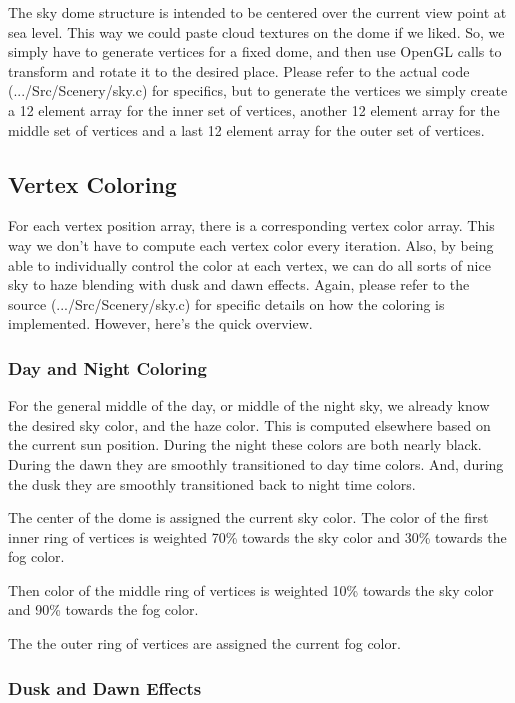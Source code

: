 \documentclass[12pt]{article}
\begin{document}
The sky dome structure is intended to be centered over the current
view point at sea level.  This way we could paste cloud textures on
the dome if we liked.  So, we simply have to generate vertices for a
fixed dome, and then use OpenGL calls to transform and rotate it to
the desired place.  Please refer to the actual code
(.../Src/Scenery/sky.c) for specifics, but
to generate the vertices we simply create a 12 element array for the
inner set of vertices, another 12 element array for the middle set of
vertices and a last 12 element array for the outer set of vertices.

\subsection{Vertex Coloring}

For each vertex position array, there is a corresponding vertex color
array.  This way we don't have to compute each vertex color every
iteration.  Also, by being able to individually control the color at
each vertex, we can do all sorts of nice sky to haze blending with
dusk and dawn effects.  Again, please refer to the source
(.../Src/Scenery/sky.c) for specific details on how the coloring is
implemented.  However, here's the quick overview.

\subsubsection{Day and Night Coloring}

For the general middle of the day, or middle of the night sky, we
already know the desired sky color, and the haze color.  This is
computed elsewhere based on the current sun position.  During the
night these colors are both nearly black.  During the dawn they are
smoothly transitioned to day time colors.  And, during the dusk they
are smoothly transitioned back to night time colors.

The center of the dome is assigned the current sky color.  The color
of the first inner ring of vertices is weighted 70\% towards the sky
color and 30\% towards the fog color.

Then color of the middle ring of vertices is weighted 10\% towards the
sky color and 90\% towards the fog color.

The the outer ring of vertices are assigned the current fog color.

\subsubsection{Dusk and Dawn Effects}
\end{document}
